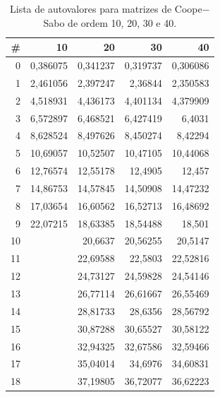 \begin{table}[htb]
	\caption{Lista de autovalores para matrizes de Coope$-$Sabo de ordem 10, 20, 30 e 40.}
	\label{tab:autovalores10a40}
\begin{center}
\begin{tabular}{r|r|r|r|r}
	\hline \hline
	\textbf{\#} &   \textbf{10} &   \textbf{20} &   \textbf{30} &   \textbf{40} \\
	\hline \hline
					 0 &   0,386075 &   0,341237 &   0,319737 &   0,306086 \\
	\hline
					 1 &   2,461056 &   2,397247 &    2,36844 &   2,350583 \\
	\hline
					 2 &   4,518931 &   4,436173 &   4,401134 &   4,379909 \\
	\hline
					 3 &   6,572897 &   6,468521 &   6,427419 &     6,4031 \\
	\hline
					 4 &   8,628524 &   8,497626 &   8,450274 &    8,42294 \\
	\hline
					 5 &   10,69057 &   10,52507 &   10,47105 &   10,44068 \\
	\hline
					 6 &   12,76574 &   12,55178 &    12,4905 &     12,457 \\
	\hline
					 7 &   14,86753 &   14,57845 &   14,50908 &   14,47232 \\
	\hline
					 8 &   17,03654 &   16,60562 &   16,52713 &   16,48692 \\
	\hline
					9 &   22,07215 &   18,63385 &   18,54488 &     18,501 \\
	\hline
					10 &            &    20,6637 &   20,56255 &    20,5147 \\
	\hline
					11 &            &   22,69588 &    22,5803 &   22,52816 \\
	\hline
					12 &            &   24,73127 &   24,59828 &   24,54146 \\
	\hline
					13 &            &   26,77114 &   26,61667 &   26,55469 \\
	\hline
					14 &            &   28,81733 &    28,6356 &   28,56792 \\
	\hline
					15 &            &   30,87288 &   30,65527 &   30,58122 \\
	\hline
					16 &            &   32,94325 &   32,67586 &   32,59466 \\
	\hline
					17 &            &   35,04014 &    34,6976 &   34,60831 \\
	\hline
					18 &            &   37,19805 &   36,72077 &   36,62223 \\

\end{tabular}
\end{center}
\end{table}
